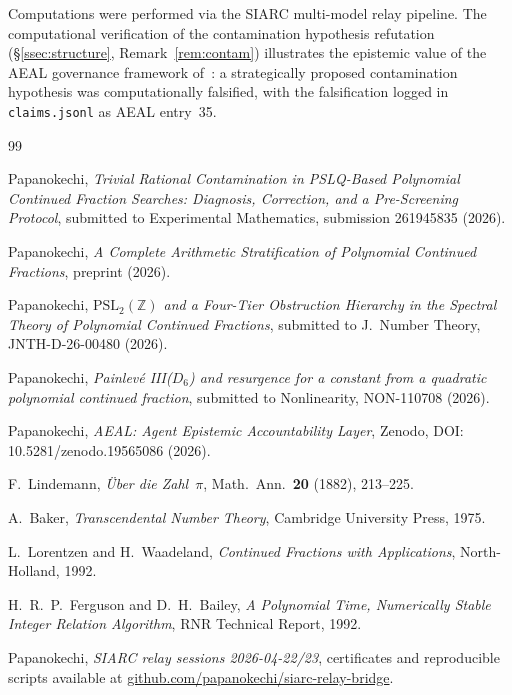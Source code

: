 \documentclass[12pt, reqno]{amsart}
\theoremstyle{definition}
\theoremstyle{remark}
\begin{document}
Computations were performed via the SIARC multi-model relay pipeline.
The computational verification of the contamination hypothesis refutation
(\S\ref{ssec:structure}, Remark~\ref{rem:contam}) illustrates the epistemic value of the AEAL governance
framework of~\cite{aeal}: a strategically proposed contamination hypothesis
was computationally falsified, with the falsification logged in \texttt{claims.jsonl}
as AEAL entry~35.


\begin{thebibliography}{99}

Papanokechi,
\emph{Trivial Rational Contamination in PSLQ-Based Polynomial
Continued Fraction Searches: Diagnosis, Correction, and a Pre-Screening Protocol},
submitted to Experimental Mathematics, submission 261945835 (2026).

Papanokechi,
\emph{A Complete Arithmetic Stratification of Polynomial Continued Fractions},
preprint (2026).

Papanokechi,
\emph{$\mathrm{PSL}_2(\mathbb{Z})$ and a Four-Tier Obstruction Hierarchy in the Spectral
Theory of Polynomial Continued Fractions},
submitted to J.\ Number Theory, JNTH-D-26-00480 (2026).

Papanokechi,
\emph{Painlev\'e III($D_6$) and resurgence for a constant from a quadratic
polynomial continued fraction},
submitted to Nonlinearity, NON-110708 (2026).

Papanokechi,
\emph{AEAL: Agent Epistemic Accountability Layer},
Zenodo, DOI: 10.5281/zenodo.19565086 (2026).

F.~Lindemann,
\emph{\"Uber die Zahl~$\pi$},
Math.\ Ann.\ \textbf{20} (1882), 213--225.

A.~Baker,
\emph{Transcendental Number Theory},
Cambridge University Press, 1975.

L.~Lorentzen and H.~Waadeland,
\emph{Continued Fractions with Applications},
North-Holland, 1992.

H.~R.~P.~Ferguson and D.~H.~Bailey,
\emph{A Polynomial Time, Numerically Stable Integer Relation Algorithm},
RNR Technical Report, 1992.

Papanokechi,
\emph{SIARC relay sessions 2026-04-22/23},
certificates and reproducible scripts available at
\url{github.com/papanokechi/siarc-relay-bridge}.


\end{thebibliography}
\end{document}
